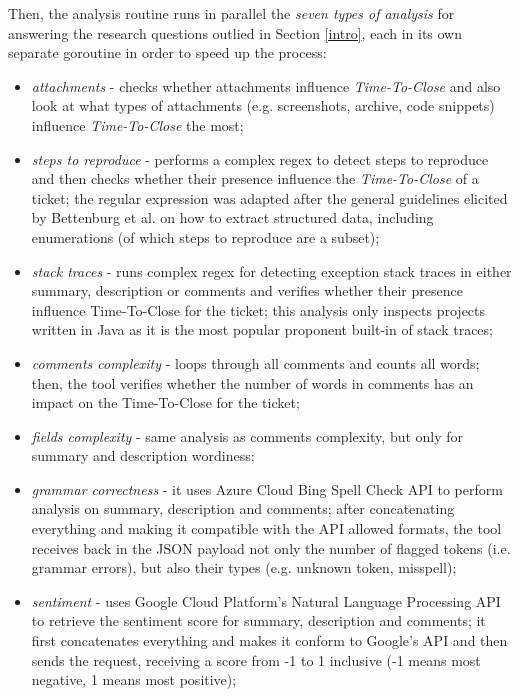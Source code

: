 \documentclass{mpaper}
\begin{document}
Then, the analysis routine runs in parallel the \emph{seven types of analysis} for answering the research questions 
outlied in Section \ref{intro}, each in its own separate goroutine in order to speed up the process:
\begin{itemize}
  \item \emph{attachments} - checks whether attachments influence \emph{Time-To-Close} and also look at what types 
  of attachments (e.g. screenshots, archive, code snippets) influence \emph{Time-To-Close} the most;
  \item \emph{steps to reproduce} - performs a complex regex to detect steps to reproduce and then checks whether their presence
  influence the \emph{Time-To-Close} of a ticket; the regular expression was adapted after the general guidelines elicited by 
  Bettenburg et al. \cite{bettenburg2008extracting} on how to extract structured data, including enumerations (of which 
  steps to reproduce are a subset);
  \item \emph{stack traces} - runs complex regex for detecting exception stack traces in either summary, description or comments 
  and verifies whether their presence influence Time-To-Close for the ticket; this analysis only inspects projects
  written in Java as it is the most popular proponent built-in of stack traces;
  \item \emph{comments complexity} - loops through all comments and counts all words; then, the tool verifies whether 
  the number of words in comments has an impact on the Time-To-Close for the ticket;
  \item \emph{fields complexity} - same analysis as comments complexity, but only for summary and description wordiness;
  \item \emph{grammar correctness} - it uses Azure Cloud Bing Spell Check API to perform analysis on summary, 
  description and comments; after concatenating everything and making it compatible with the API allowed formats, the tool 
  receives back in the JSON payload not only the number of flagged tokens (i.e. grammar errors), but also their types 
  (e.g. unknown token, misspell);
  \item \emph{sentiment} - uses Google Cloud Platform's Natural Language Processing API to retrieve the 
  sentiment score for summary, description and comments; it first concatenates everything and makes it conform to Google's 
  API and then sends the request, receiving a score from -1 to 1 inclusive (-1 means most negative, 1 means most 
  positive);
\end{itemize}
\end{document}
